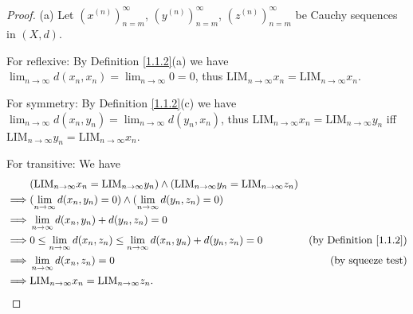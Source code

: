 \begin{proof}{(a)}
    Let \((x^{(n)})_{n = m}^\infty\), \((y^{(n)})_{n = m}^\infty\), \((z^{(n)})_{n = m}^\infty\) be Cauchy sequences in \((X, d)\).

    For reflexive:
    By Definition \ref{1.1.2}(a) we have \(\lim_{n \to \infty} d(x_n, x_n) = \lim_{n \to \infty} 0 = 0\), thus \(\text{LIM}_{n \to \infty} x_n = \text{LIM}_{n \to \infty} x_n\).

    For symmetry:
    By Definition \ref{1.1.2}(c) we have \(\lim_{n \to \infty} d(x_n, y_n) = \lim_{n \to \infty} d(y_n, x_n)\), thus \(\text{LIM}_{n \to \infty} x_n = \text{LIM}_{n \to \infty} y_n\) iff \(\text{LIM}_{n \to \infty} y_n = \text{LIM}_{n \to \infty} x_n\).

    For transitive:
    We have
    \begin{align*}
                 & (\text{LIM}_{n \to \infty} x_n = \text{LIM}_{n \to \infty} y_n) \land (\text{LIM}_{n \to \infty} y_n = \text{LIM}_{n \to \infty} z_n)                                      \\
        \implies & (\lim_{n \to \infty} d(x_n, y_n) = 0) \land (\lim_{n \to \infty} d(y_n, z_n) = 0)                                                                                          \\
        \implies & \lim_{n \to \infty} d(x_n, y_n) + d(y_n, z_n) = 0                                                                                                                          \\
        \implies & 0 \leq \lim_{n \to \infty} d(x_n, z_n) \leq \lim_{n \to \infty} d(x_n, y_n) + d(y_n, z_n) = 0                                         & \text{(by Definition \ref{1.1.2})} \\
        \implies & \lim_{n \to \infty} d(x_n, z_n) = 0                                                                                                   & \text{(by squeeze test)}           \\
        \implies & \text{LIM}_{n \to \infty} x_n = \text{LIM}_{n \to \infty} z_n.
    \end{align*}
\end{proof}

